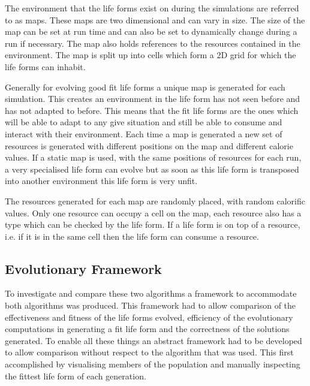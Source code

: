 \documentclass[12pt]{article}
\begin{document}
The environment that the life forms exist on during the simulations are referred to as maps. These maps are two dimensional and can vary in size.
The size of the map can be set at run time and can also be set to dynamically change during a run if necessary. The map also holds references
to the resources contained in the environment. The map is split up into cells which form a 2D grid for which the life forms can inhabit. 

Generally for evolving good fit life forms a unique map is generated for each simulation. This creates an environment in the life form has not
seen before and has not adapted to before. This means that the fit life forms are the ones which will be able to adapt to any give situation
and still be able to consume and interact with their environment. Each time a map is generated a new set of resources is generated with different
positions on the map and different calorie values. If a static map is used, with the same positions of resources for each run, a very specialised 
life form can evolve but as soon as this life form is transposed into another environment this life form is very unfit.

The resources generated for each map are randomly placed, with random calorific values. Only one resource can occupy a cell on the map, each resource also has
a type which can be checked by the life form. If a life form is on top of a resource, i.e. if it is in the same cell then the life form can consume a resource. 
 

\subsection{Evolutionary Framework}
To investigate and compare these two algorithms %
a framework to accommodate both algorithms was produced. This framework had to allow comparison of the effectiveness and fitness of the life forms evolved, efficiency of the 
evolutionary computations in generating a fit life form and the correctness of the solutions generated. To enable all these things an abstract framework had 
to be developed to allow comparison without respect to the algorithm that was used. This first accomplished by visualising members of the population and 
manually inspecting the fittest life form of each generation. 
\end{document}
